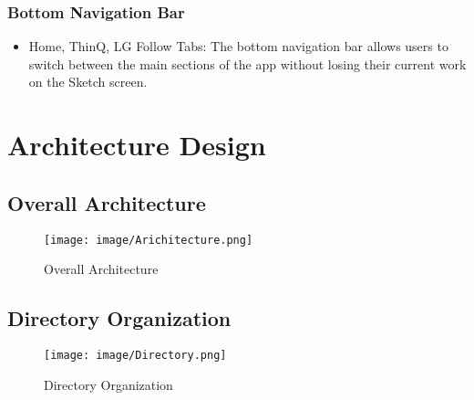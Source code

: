 \documentclass[conference]{IEEEtran}
\begin{document}
\subsubsection{Bottom Navigation Bar}
\begin{itemize}
    \item Home, ThinQ, LG Follow Tabs: The bottom navigation bar allows users to switch between the main sections of the app without losing their current work on the Sketch screen.\\
\end{itemize}


\section{Architecture Design}

\subsection{Overall Architecture}

\begin{figure}[h!]
    \centering
    \texttt{[image: image/Arichitecture.png]}
    \caption{Overall Architecture}
    \label{fig:enter-label}
\end{figure}
 

\subsection{Directory Organization}

\begin{figure}[h!]
    \centering
    \texttt{[image: image/Directory.png]}
    \caption{Directory Organization}
    \label{fig:enter-label}
\end{figure}
\end{document}
